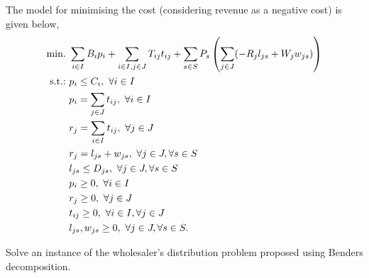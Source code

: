 The model for minimising the cost (considering revenue as a negative cost) is given below,
%
\begin{align*}
	\mathop{\text{min.~}} & \sum\limits_{i \in I} B_i p_i + \sum\limits_{i \in I, j \in J} T_{ij} t_{ij} + \sum\limits_{s \in S} P_s \left( \sum\limits_{j \in J} (-R_j l_{js} + W_j w_{js}) \right)                  \\
	 \mathop{\text{s.t.:~}} & p_i \leq C_i, \                              \forall i \in I                  \\
	     & p_i = \sum\limits_{j \in J}t_{ij}, \         \forall i \in I                  \\
	     & r_j = \sum\limits_{i \in I}t_{ij}, \         \forall j \in J                  \\
	     & r_j = l_{js} + w_{js}, \                     \forall j \in J, \forall s \in S \\
	     & l_{js} \leq D_{js}, \                        \forall j \in J, \forall s \in S \\
	     & p_i \geq 0, \                                \forall i \in I                  \\
	     & r_j \geq 0, \                                \forall j \in J                  \\
	     & t_{ij} \geq 0, \                             \forall i \in I, \forall j \in J \\
	     & l_{js}, w_{js} \geq 0, \                     \forall j \in J, \forall s \in S. 
\end{align*}

Solve an instance of the wholesaler's distribution problem proposed using Benders decomposition. 